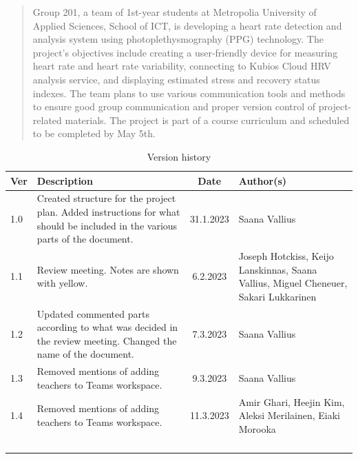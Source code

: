 \documentclass{article}
\begin{document}
\newpage

\begin{abstract}
Group 201, a team of 1st-year students at Metropolia University of Applied Sciences, School of ICT, is developing a heart rate detection and analysis system using photoplethysmography (PPG) technology. The project's objectives include creating a user-friendly device for measuring heart rate and heart rate variability, connecting to Kubios Cloud HRV analysis service, and displaying estimated stress and recovery status indexes. The team plans to use various communication tools and methods to ensure good group communication and proper version control of project-related materials. The project is part of a course curriculum and scheduled to be completed by May 5th.
\end{abstract}





\vspace{1cm}

\begin{table}[h]
\centering
\begin{tabular}{|p{1cm}|p{5cm}|c|p{3.5cm}|}
\hline
\textbf{Ver} & \textbf{Description} & \textbf{Date} & \textbf{Author(s)} \\ \hline
1.0 & Created structure for the project plan. Added instructions for what should be included in the various parts of the document.   & 31.1.2023 & Saana Vallius \\ \hline
1.1 & Review meeting. Notes are shown with yellow.  & 6.2.2023 & Joseph Hotckiss,  Keijo Lanskinnas, Saana Vallius, Miguel Cheneuer, Sakari Lukkarinen \\ \hline
1.2 & Updated commented parts according to what was decided in the review meeting. Changed the name of the document. & 7.3.2023 & Saana Vallius \\ \hline
1.3 &  Removed mentions of adding teachers to Teams workspace. & 9.3.2023 & Saana Vallius \\ \hline
1.4 &  Removed mentions of adding teachers to Teams workspace. & 11.3.2023 & Amir Ghari, Heejin Kim, Aleksi Merilainen, Eiaki Morooka \\ \hline
 &  &  &  \\ \hline
 &  &  &  \\ \hline
 &  &  &  \\ \hline
 &  &  &  \\ \hline
\end{tabular}
\caption{Version history}
\label{table:version-history}
\end{table}
\end{document}
